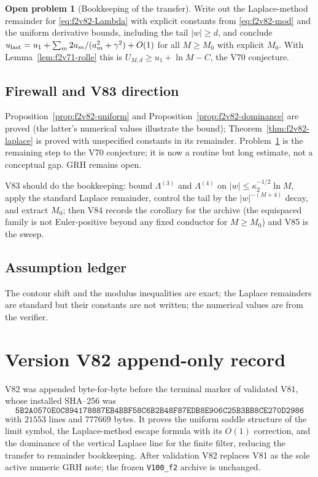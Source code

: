 \documentclass[11pt]{article}
\theoremstyle{definition}
\newtheorem{problem}[theorem]{Open problem}
\theoremstyle{remark}
\begin{document}
\begin{problem}[Bookkeeping of the transfer]
\label{prob:f2v82-bookkeeping}
Write out the Laplace-method remainder for \eqref{eq:f2v82-Lambda} with
explicit constants from \eqref{eq:f2v82-mod} and the uniform derivative
bounds, including the tail \(|w|\ge d\), and conclude
\(u_{\rm last}=u_1+\sum_m2a_m/(a_m^2+\gamma^2)+O(1)\) for all \(M\ge M_0\)
with explicit \(M_0\).  With Lemma~\ref{lem:f2v71-rolle} this is
\(U_{M,d}\ge u_1+\ln M-C\), the V70 conjecture.
\end{problem}

\subsection*{Firewall and V83 direction}
\label{fire:f2v82}
Proposition~\ref{prop:f2v82-uniform} and
Proposition~\ref{prop:f2v82-dominance} are proved (the latter's numerical
values illustrate the bound);
Theorem~\ref{thm:f2v82-laplace} is proved with unspecified constants in
its remainder.  Problem~\ref{prob:f2v82-bookkeeping} is the remaining
step to the V70 conjecture; it is now a routine but long estimate, not a
conceptual gap.  GRH remains open.

V83 should do the bookkeeping: bound \(\Lambda^{(3)}\) and \(\Lambda^{(4)}\)
on \(|w|\le\kappa_2^{-1/2}\ln M\), apply the standard Laplace remainder,
control the tail by the \(|w|^{-(M+4)}\) decay, and extract \(M_0\); then
V84 records the corollary for the archive (the equispaced family is not
Euler-positive beyond any fixed conductor for \(M\ge M_0\)) and V85 is
the sweep.

\subsection*{Assumption ledger}
\label{ass:f2v82}
The contour shift and the modulus inequalities are exact; the Laplace
remainders are standard but their constants are not written; the
numerical values are from the verifier.
\endgroup

\section*{Version V82 append-only record}

V82 was appended byte-for-byte before the terminal marker of validated
V81, whose installed SHA--256 was
\[
 \texttt{5B2A0570E0C894178887EB4BBF58C6B2}
 \allowbreak\texttt{B48F87EDB8E906C25B3BB8CE270D2986}
\]
with \(21553\) lines and \(777669\) bytes.  It proves the uniform
saddle structure of the limit symbol, the Laplace-method escape formula
with its \(O(1)\) correction, and the dominance of the vertical Laplace
line for the finite filter, reducing the transfer to remainder
bookkeeping.  After validation V82 replaces V81 as the sole active
numeric GRH note; the frozen \texttt{V100\_f2} archive is unchanged.
\end{document}
